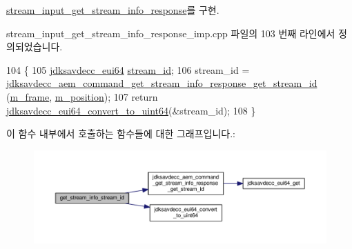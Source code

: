 \hyperlink{classavdecc__lib_1_1stream__input__get__stream__info__response_a075bc859c84291de462603064f31dd06}{stream\+\_\+input\+\_\+get\+\_\+stream\+\_\+info\+\_\+response}를 구현.



stream\+\_\+input\+\_\+get\+\_\+stream\+\_\+info\+\_\+response\+\_\+imp.\+cpp 파일의 103 번째 라인에서 정의되었습니다.


\begin{DoxyCode}
104 \{
105     \hyperlink{structjdksavdecc__eui64}{jdksavdecc\_eui64} \hyperlink{avtp_8h_af5af7b461263e29ceb91a8d3a8bc2c97}{stream\_id};
106     stream\_id = \hyperlink{group__command__get__stream__info__response_ga4f291b37baae43a9121c4a9cd97ce4ca}{jdksavdecc\_aem\_command\_get\_stream\_info\_response\_get\_stream\_id}
      (\hyperlink{classavdecc__lib_1_1stream__input__get__stream__info__response__imp_a50417969cf438e7c8d698726bbbe2ff9}{m\_frame}, \hyperlink{classavdecc__lib_1_1stream__input__get__stream__info__response__imp_af5e691c4a8a0feb07f48440b321206cd}{m\_position});
107     \textcolor{keywordflow}{return} \hyperlink{group__eui64_ga1c9a3634faa4bec90dea5a52e691bf63}{jdksavdecc\_eui64\_convert\_to\_uint64}(&stream\_id);
108 \}
\end{DoxyCode}


이 함수 내부에서 호출하는 함수들에 대한 그래프입니다.\+:
\nopagebreak
\begin{figure}[H]
\begin{center}
\leavevmode
\includegraphics[width=350pt]{classavdecc__lib_1_1stream__input__get__stream__info__response__imp_af3936cefa1b1b6de8c200f2cb0d0ff32_cgraph}
\end{center}
\end{figure}


